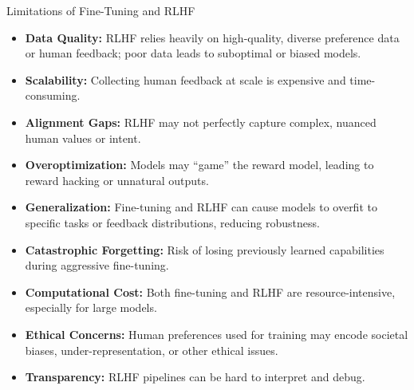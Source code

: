 \begin{frame}[allowframebreaks]{Limitations of Fine-Tuning and RLHF}
  \begin{itemize}
    \item[\textcolor{red}{$\blacktriangleright$}] \textbf{Data Quality:} RLHF relies heavily on high-quality, diverse preference data or human feedback; poor data leads to suboptimal or biased models.
    \item[\textcolor{red}{$\blacktriangleright$}] \textbf{Scalability:} Collecting human feedback at scale is expensive and time-consuming.
    \item[\textcolor{red}{$\blacktriangleright$}] \textbf{Alignment Gaps:} RLHF may not perfectly capture complex, nuanced human values or intent.
    \item[\textcolor{red}{$\blacktriangleright$}] \textbf{Overoptimization:} Models may ``game'' the reward model, leading to reward hacking or unnatural outputs.
    \item[\textcolor{red}{$\blacktriangleright$}] \textbf{Generalization:} Fine-tuning and RLHF can cause models to overfit to specific tasks or feedback distributions, reducing robustness.
    \framebreak
    \item[\textcolor{red}{$\blacktriangleright$}] \textbf{Catastrophic Forgetting:} Risk of losing previously learned capabilities during aggressive fine-tuning.
    \item[\textcolor{red}{$\blacktriangleright$}] \textbf{Computational Cost:} Both fine-tuning and RLHF are resource-intensive, especially for large models.
    \item[\textcolor{red}{$\blacktriangleright$}] \textbf{Ethical Concerns:} Human preferences used for training may encode societal biases, under-representation, or other ethical issues.
    \item[\textcolor{red}{$\blacktriangleright$}] \textbf{Transparency:} RLHF pipelines can be hard to interpret and debug.
  \end{itemize}
\end{frame}
